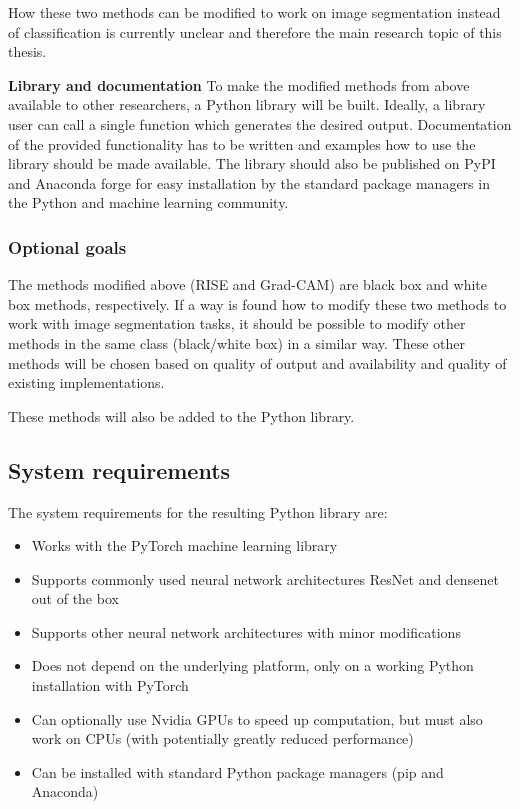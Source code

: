 How these two methods can be modified to work on image segmentation instead of classification is currently unclear and therefore the main research topic of this thesis.

\textbf{Library and documentation}
To make the modified methods from above available to other researchers, a Python library will be built. Ideally, a library user can call a single function
which generates the desired output. Documentation of the provided functionality has to be written and examples how to use the library should be made available. The library should also be published on PyPI and Anaconda forge for easy installation by the standard package managers in the
Python and machine learning community.

\subsubsection{Optional goals}
The methods modified above (RISE and Grad-CAM) are black box and white box methods, respectively.
If a way is found how to modify these two methods to work with image segmentation tasks, it should be possible to modify other
methods in the same class (black/white box) in a similar way. These other methods will be chosen based on quality of output and availability and quality of existing implementations.

These methods will also be added to the Python library.

\subsection{System requirements}
The system requirements for the resulting Python library are:

\begin{itemize}
    \item Works with the PyTorch machine learning library
    \item Supports commonly used neural network architectures ResNet and densenet out of the box
    \item Supports other neural network architectures with minor modifications
    \item Does not depend on the underlying platform, only on a working Python installation with PyTorch
    \item Can optionally use Nvidia GPUs to speed up computation, but must also work on CPUs (with potentially greatly reduced performance)
    \item Can be installed with standard Python package managers (pip and Anaconda)
\end{itemize}

